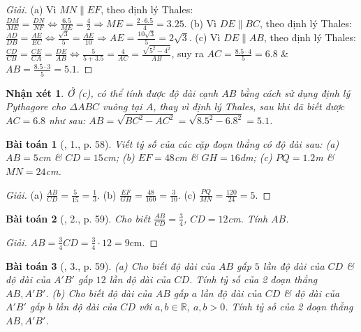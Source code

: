 \documentclass{article}
\newtheorem{baitoan}{Bài toán}
\newtheorem{nhanxet}{Nhận xét}
\begin{document}
\begin{proof}[Giải]
	(a) Vì $MN\parallel EF$, theo định lý Thales: $\frac{DM}{ME} = \frac{DN}{NF}\Leftrightarrow\frac{6.5}{ME} = \frac{4}{2}\Rightarrow ME = \frac{2\cdot6.5}{4} = 3.25$. (b) Vì $DE\parallel BC$, theo định lý Thales: $\frac{AD}{DB} = \frac{AE}{EC}\Leftrightarrow\frac{\sqrt{3}}{5} = \frac{AE}{10}\Rightarrow AE = \frac{10\sqrt{3}}{5} = 2\sqrt{3}$. (c) Vì $DE\parallel AB$, theo định lý Thales: $\frac{CD}{CB} = \frac{CE}{CA} = \frac{DE}{AB}\Leftrightarrow\frac{5}{5 + 3.5} = \frac{4}{AC} = \frac{\sqrt{5^2 - 4^2}}{AB}$, suy ra $AC = \frac{8.5\cdot4}{5} = 6.8$ \& $AB = \frac{8.5\cdot3}{5} = 5.1$.
\end{proof}

\begin{nhanxet}
	Ở (c), có thể tính được độ dài cạnh $AB$ bằng cách sử dụng định lý Pythagore cho $\Delta ABC$ vuông tại $A$, thay vì định lý Thales, sau khi đã biết được $AC = 6.8$ như sau: $AB = \sqrt{BC^2 - AC^2} = \sqrt{8.5^2 - 6.8^2} = 5.1$.
\end{nhanxet}

\begin{baitoan}[\cite{SGK_Toan_8_tap_2}, 1., p. 58]
	Viết tỷ số của các cặp đoạn thẳng có độ dài sau: (a) $AB = 5$\emph{cm} \& $CD = 15$\emph{cm}; (b) $EF = 48$\emph{cm} \& $GH = 16$\emph{dm}; (c) $PQ = 1.2$\emph{m} \& $MN = 24$\emph{cm}.
\end{baitoan}

\begin{proof}[Giải]
	(a) $\frac{AB}{CD} = \frac{5}{15} = \frac{1}{3}$. (b) $\frac{EF}{GH} = \frac{48}{160} = \frac{3}{10}$. (c) $\frac{PQ}{MN} = \frac{120}{24} = 5$.
\end{proof}

\begin{baitoan}[\cite{SGK_Toan_8_tap_2}, 2., p. 59]
	Cho biết $\frac{AB}{CD} = \frac{3}{4}$, $CD = 12$\emph{cm}. Tính $AB$.
\end{baitoan}

\begin{proof}[Giải]
	$AB = \frac{3}{4}CD = \frac{3}{4}\cdot12 = 9$cm.
\end{proof}

\begin{baitoan}[\cite{SGK_Toan_8_tap_2}, 3., p. 59]
	(a) Cho biết độ dài của $AB$ gấp $5$ lần độ dài của $CD$ \& độ dài của $A'B'$ gấp $12$ lần độ dài của $CD$. Tính tỷ số của 2 đoạn thẳng $AB,A'B'$. (b) Cho biết độ dài của $AB$ gấp $a$ lần độ dài của $CD$ \& độ dài của $A'B'$ gấp $b$ lần độ dài của $CD$ với $a,b\in\mathbb{R}$, $a,b > 0$. Tính tỷ số của 2 đoạn thẳng $AB,A'B'$.
\end{baitoan}
\end{document}
